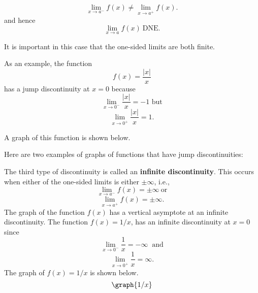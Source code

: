 \documentclass{ximera}
\begin{document}
\[\lim_{x \to a^-} f(x) \neq \lim_{x \to a^+} f(x).\]
and hence
\[
\lim_{x \to a} f(x) \ \text{DNE}.
\]

It is important in this case that the one-sided limits are both finite.

\begin{example}[example 4]
As an example, the function 
\[f(x) = \frac{|x|}{x}\]
 has a jump discontinuity at $x = 0$ because
\[\lim_{x \to 0^-} \frac{|x|}{x} = -1 \text{  but} \]
\[\lim_{x \to 0^+} \frac{|x|}{x} = 1. \]

A graph of this function is shown below.

\end{example}

Here are two examples of graphs of functions that have jump discontinuities:

\begin{center}
\hspace{1.5 in}
\end{center}


The third type of discontinuity is called an \textbf{infinite discontinuity}. 
This occurs when either of the one-sided limits is either $\pm \infty$, i.e., 
\[\lim_{x \to a^-} f(x) = \pm\infty \ \text{or}  \]
\[\lim_{x \to a^+} f(x) = \pm\infty. \]
The graph of the function $f(x)$ has a vertical asymptote at an infinite discontinuity.
The function $f(x) = 1/x$,  has an infinite discontinuity at $x=0$ since
\[\lim_{x \to 0^-} \frac{1}{x} = -\infty \ \text {  and}\]
\[\lim_{x \to 0^+} \frac{1}{x} = \infty.\]
The graph of $f(x) = 1/x$ is shown below.
\[
\graph{1/x}
\]
\end{document}

